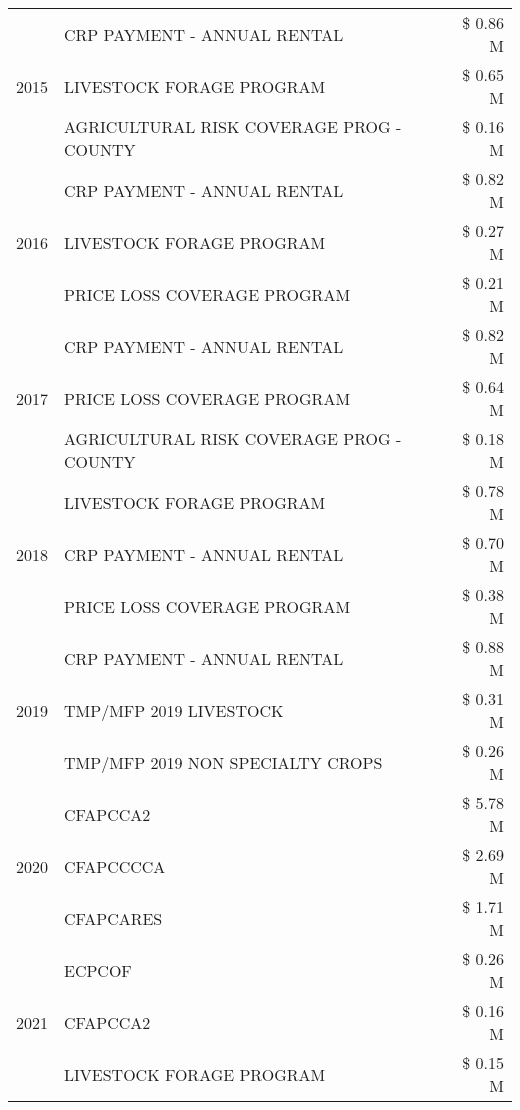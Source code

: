 \begin{tabular}{llr}
\multirow[t]{3}{*}{2015} & CRP PAYMENT - ANNUAL RENTAL & \$ 0.86 M \\
 & LIVESTOCK FORAGE PROGRAM & \$ 0.65 M \\
 & AGRICULTURAL RISK COVERAGE PROG - COUNTY & \$ 0.16 M \\
\cline{1-3}
\multirow[t]{3}{*}{2016} & CRP PAYMENT - ANNUAL RENTAL & \$ 0.82 M \\
 & LIVESTOCK FORAGE PROGRAM & \$ 0.27 M \\
 & PRICE LOSS COVERAGE PROGRAM & \$ 0.21 M \\
\cline{1-3}
\multirow[t]{3}{*}{2017} & CRP PAYMENT - ANNUAL RENTAL & \$ 0.82 M \\
 & PRICE LOSS COVERAGE PROGRAM & \$ 0.64 M \\
 & AGRICULTURAL RISK COVERAGE PROG - COUNTY & \$ 0.18 M \\
\cline{1-3}
\multirow[t]{3}{*}{2018} & LIVESTOCK FORAGE PROGRAM & \$ 0.78 M \\
 & CRP PAYMENT - ANNUAL RENTAL & \$ 0.70 M \\
 & PRICE LOSS COVERAGE PROGRAM & \$ 0.38 M \\
\cline{1-3}
\multirow[t]{3}{*}{2019} & CRP PAYMENT - ANNUAL RENTAL & \$ 0.88 M \\
 & TMP/MFP 2019 LIVESTOCK & \$ 0.31 M \\
 & TMP/MFP 2019 NON SPECIALTY CROPS & \$ 0.26 M \\
\cline{1-3}
\multirow[t]{3}{*}{2020} & CFAPCCA2 & \$ 5.78 M \\
 & CFAPCCCCA & \$ 2.69 M \\
 & CFAPCARES & \$ 1.71 M \\
\cline{1-3}
\multirow[t]{3}{*}{2021} & ECPCOF & \$ 0.26 M \\
 & CFAPCCA2 & \$ 0.16 M \\
 & LIVESTOCK FORAGE PROGRAM & \$ 0.15 M \\
\cline{1-3}
\bottomrule
\end{tabular}
